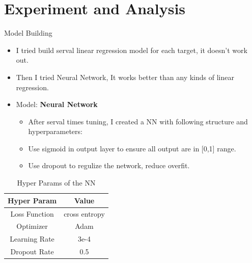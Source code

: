 \documentclass[
 size=12pt,
 paper=smartboard, %
 mode=present, %
 display=slides, %
style=tuliplab,
pauseslide,
fleqn,leqno]{powerdot}
\begin{document}
\section{Experiment and Analysis}
\begin{slide}{Model Building}
    \begin{itemize}
        \item I tried build serval linear regression model for each target, it doesn't work out.
        \item Then I tried Neural Network, It works better than any kinds of linear regression.
        \item Model: \textbf{Neural Network}
        \begin{itemize}
            \item After serval times tuning, I created a NN with following structure and hyperparameters:
            \item Use sigmoid in output layer to ensure all output are in [0,1] range.
            \item Use dropout to regulize the network, reduce overfit.
        \end{itemize}
    \end{itemize}
    {
        \vspace{0.05\slideheight}
        \begin{table}
            \centering
            \caption{Hyper Params of the NN}
            \label{tbl:NN2}
            \begin{tabular}{cc}
                \hline
                Hyper Param & Value   \\
                \hline
                Loss Function & cross entropy\\
                Optimizer & Adam \\
                Learning Rate & 3e-4 \\
                Dropout Rate & 0.5 \\
                \hline
             \end{tabular}
        \end{table}
    }
\end{slide}
\end{document}
